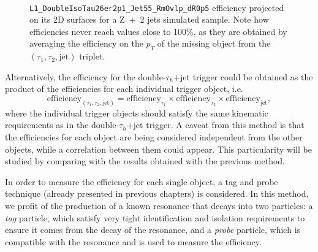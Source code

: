 \documentclass[../main.tex]{subfiles}
\begin{document}
\begin{figure}[h!]
\begin{center}
 \\
\end{center}
\caption{\texttt{L1\_DoubleIsoTau26er2p1\_Jet55\_RmOvlp\_dR0p5} efficiency projected on its 2D surfaces for a Z~+~2 jets simulated sample. Note how efficiencies never reach values close to 100\%, as they are obtained by averaging the efficiency on the $p_T$ of the missing object from the $(\tau_1, \tau_2, \text{jet})$ triplet.}
\label{hh:fig:l1_2d_eff}
\end{figure}

Alternatively, the efficiency for the double-$\tau_h$+jet trigger could be obtained as the product of the efficiencies for each individual trigger object, i.e.
\begin{equation}
\label{hh:eq:eff_per_legs}
\text{efficiency}_{(\tau_1,\tau_2,\text{jet})} = \text{efficiency}_{\tau_1}\times\text{efficiency}_{\tau_2}\times\text{efficiency}_{\text{jet}},
\end{equation}
where the individual trigger objects should satisfy the same kinematic requirements as in the double-$\tau_h$+jet trigger. A caveat from this method is that the efficiencies for each object are being considered independent from the other objects, while a correlation between them could appear. This particularity will be studied by comparing with the results obtained with the previous method.

In order to measure the efficiency for each single object, a tag and probe technique (already presented in previous chapters) is considered. In this method, we profit of the production of a known resonance that decays into two particles: a \textit{tag} particle, which satisfy very tight identification and isolation requirements to ensure it comes from the decay of the resonance, and a \textit{probe} particle, which is compatible with the resonance and is used to measure the efficiency.
\end{document}
